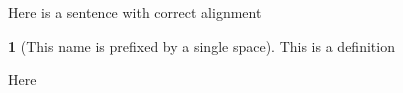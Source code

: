 \documentclass{beamer}
\theoremstyle{definition}
\newtheorem{mydef}{}[theorem]
\begin{document}
\begin{frame}
\noindent Here is a sentence with correct alignment
\begin{mydef}[This name is prefixed by a single space]
This is a definition 
\end{mydef}
\noindent Here
\end{frame}
\end{document}
